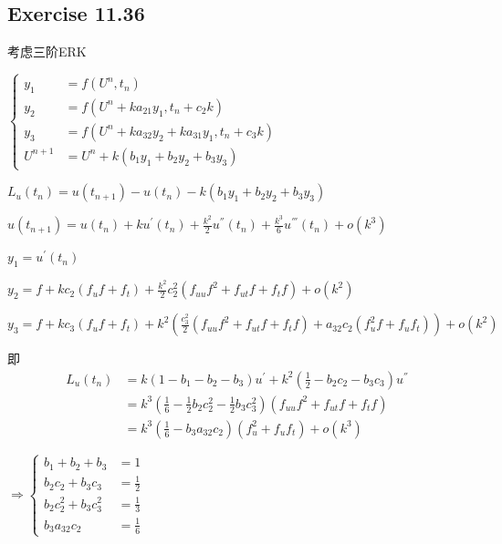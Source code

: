 \documentclass[UTF8]{ctexart}
\begin{document}
\pagestyle{fancy}
\fancyhead{}
\rhead{\today}




\subsection*{Exercise 11.36}
考虑三阶ERK

$
\left\{
    \begin{aligned}
        y_1 &= f(U^n, t_n) \\
        y_2 &= f(U^n + ka_{21}y_1, t_n + c_2k) \\
        y_3 &= f(U^n + ka_{32}y_2 + ka_{31}y_1, t_n + c_3k) \\
        U^{n+1} &= U^n + k(b_1y_1 + b_2y_2 + b_3y_3) 
    \end{aligned}
\right.
$

$L_u(t_n) = u(t_{n+1}) - u(t_n) - k(b_1y_1 + b_2y_2 + b_3y_3)$

$u(t_{n+1}) = u(t_n) + ku^{'}(t_n) + \frac{k^2}{2}u^{''}(t_n) + \frac{k^3}{6}u^{'''}(t_n) + o(k^3)$

$y_1 = u^{'}(t_n)$

$y_2 = f + kc_2(f_uf + f_t) + \frac{k^2}{2}c_2^2(f_{uu}f^2 + f_{ut}f + f_tf) + o(k^2) $

$y_3 = f + kc_3(f_uf + f_t) + k^2(\frac{c_3^2}{2}(f_{uu}f^2 + f_{ut}f + f_tf) + a_{32}c_2(f^2_uf + f_uf_t)) + o(k^2) $

即\begin{align*}
    L_u(t_n) &= k(1-b_1-b_2-b_3)u^{'} + k^2(\frac{1}{2} - b_2c_2 - b_3c_3)u^{''} \\    
             &= k^3(\frac{1}{6} - \frac{1}{2}b_2c_2^2 - \frac{1}{2}b_3c_3^2)(f_{uu}f^2 + f_{ut}f + f_tf) \\
             &= k^3(\frac{1}{6} - b_3a_{32}c_2)(f_u^2 + f_uf_t) + o(k^3) 
\end{align*}

$\Rightarrow
\left\{
    \begin{aligned}
        b_1 + b_2 + b_3 &= 1 \\
        b_2c_2 + b_3c_3 &= \frac{1}{2} \\
        b_2c_2^2 + b_3c_3^2 &= \frac{1}{3} \\
        b_3a_{32}c_2 &= \frac{1}{6}
    \end{aligned}
\right.
$
\end{document}
